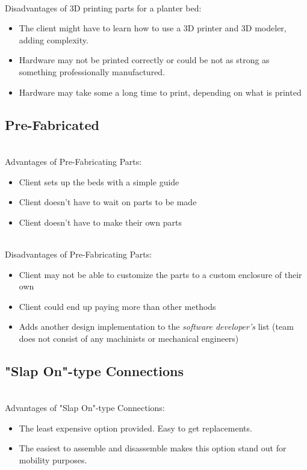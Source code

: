 \documentclass[onecolumn, draftclsnofoot,10pt, compsoc]{IEEEtran}
\begin{document}
		\noindent \\Disadvantages of 3D printing parts for a planter bed:
		\begin{itemize}
			\item The client might have to learn how to use a 3D printer and 3D modeler, adding complexity.
			\item Hardware may not be printed correctly or could be not as strong as something professionally manufactured.
			\item Hardware may take some a long time to print, depending on what is printed
		\end{itemize}


		\subsection{Pre-Fabricated}

		\noindent \\Advantages of Pre-Fabricating Parts:
		\begin{itemize}
			\item Client sets up the beds with a simple guide
			\item Client doesn't have to wait on parts to be made
			\item Client doesn't have to make their own parts
		\end{itemize}

		\noindent \\Disadvantages of Pre-Fabricating Parts:
		\begin{itemize}
			\item Client may not be able to customize the parts to a custom enclosure of their own
			\item Client could end up paying more than other methods
			\item Adds another design implementation to the \textit{software developer's} list (team does not consist of any machinists or mechanical engineers)
		\end{itemize}


		\subsection{"Slap On"-type Connections}

		\noindent \\Advantages of "Slap On"-type Connections:
		\begin{itemize}
			\item The least expensive option provided.  Easy to get replacements.
			\item The easiest to assemble and disassemble makes this option stand out for mobility purposes.
		\end{itemize}
\end{document}
